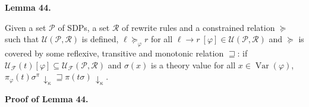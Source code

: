  
 
\par\medskip\noindent\textbf{Lemma 44.}\par
 
 
Given a set $\mathcal{P}$ of SDPs, a set $\mathcal{R}$ of rewrite rules and a constrained relation $\succeq$ such that $\mathcal{U}(\mathcal{P},\mathcal{R})$ is defined, ${\ell}\mathrel{\succeq}_{\varphi}{r}$ for all ${\ell}\rightarrow{r}\ [\varphi]\in\mathcal{U}(\mathcal{P},\mathcal{R})$ and $\succeq$ is covered by some reflexive, transitive and monotonic relation $\sqsupseteq$: if $\mathcal{U}_{\mathcal{F}}(t)[\varphi]\subseteq\mathcal{U}_{\mathcal{F}}(\mathcal{P},\mathcal{R})$ and $\sigma(x)$ is a theory value for all $x\in\operatorname{Var}(\varphi)$, $\pi_{\varphi}(t)\sigma^{\pi}\,{\downarrow}_{\kappa}\sqsupseteq\pi(t\sigma)\,{\downarrow}_{\kappa}$.\par
 
 
 
 
 
\par\medskip\noindent\textbf{Proof of Lemma 44.}\par
 
 
